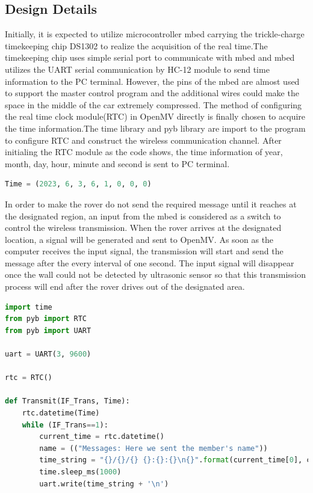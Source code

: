 \documentclass[12pt, a4paper, oneside]{report}
\begin{document}
	\subsection{Design Details}
	Initially, it is expected to utilize microcontroller mbed carrying the trickle-charge timekeeping chip DS1302 to realize the acquisition of the real time.The timekeeping chip uses simple serial port to communicate with mbed and mbed utilizes the UART serial communication by HC-12 module to send time information to the PC terminal. However, the pins of the mbed are almost used to support the master control program and the additional wires could make the space in the middle of the car extremely compressed. The method of configuring the real time clock module(RTC) in OpenMV directly is finally chosen to acquire the time information.The time library and pyb library are import to the program to configure RTC and construct the wireless communication channel. After initialing the RTC module as the code shows, the time information of year, month, day, hour, minute and second is sent to PC terminal.
	
	\begin{lstlisting}[language=Python]
Time = (2023, 6, 3, 6, 1, 0, 0, 0)
\end{lstlisting}

In order to make the rover do not send the required message until it reaches at the designated region, an input from the mbed is considered as a switch to control the wireless transmission. When the rover arrives at the designated location, a signal will be generated and sent to OpenMV. As soon as the computer receives the input signal, the transmission will start and send the message after the every interval of one second. The input signal will disappear once the wall could not be detected by ultrasonic sensor so that this transmission process will end after the rover drives out of the designated area.

\begin{lstlisting}[language=Python]
import time
from pyb import RTC
from pyb import UART

uart = UART(3, 9600)

rtc = RTC()

def Transmit(IF_Trans, Time):
    rtc.datetime(Time)
    while (IF_Trans==1):
        current_time = rtc.datetime()
        name = (("Messages: Here we sent the member's name"))
        time_string = "{}/{}/{} {}:{}:{}\n{}".format(current_time[0], current_time[1], current_time[2], current_time[4], current_time[5], current_time[6], name)
        time.sleep_ms(1000)
        uart.write(time_string + '\n')
\end{lstlisting}
\end{document}
